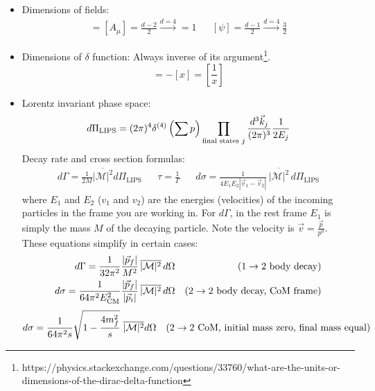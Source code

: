 \documentclass[11pt, oneside]{article}   	%
\theoremstyle{definition}
\numberwithin{equation}{subsection}		%
\begin{document}
\begin{itemize}
	\item Dimensions of fields:
	\begin{align}
		[\phi] = [A_\mu] = \frac{d - 2}{2}\xrightarrow{d = 4} = 1 && [\psi] = \frac{d - 1}{2} \xrightarrow{d = 4} \frac{3}{2}
	\end{align}
	
	\item Dimensions of $\delta$ function: Always inverse of its 
	argument\footnote{https://physics.stackexchange.com/questions/33760/what-are-the-units-or-dimensions-of-the-dirac-delta-function}.
	\begin{equation}
		[\delta(x)] = -[x] = \left[\frac{1}{x}\right]
	\end{equation}
	
	\item Lorentz invariant phase space:
	\begin{equation}
		d\Pi_\mathrm{LIPS} = (2\pi)^4 \delta^{(4)}\left(\sum p\right) \prod_{\textnormal{final states } j} \frac{d^3\vec k_j}{(2\pi)^3} \frac{1}{2 E_j}
	\end{equation}
	Decay rate and cross section formulas:
	\begin{align}
		d\Gamma = \frac{1}{2 M} \overline{|\mathcal M|^2} d\Pi_\mathrm{LIPS} && \tau = \frac{1}{\Gamma} && d\sigma = \frac{1}{4 E_1 E_2 |\vec v_1 - \vec v_2|}\,
		\overline{|\mathcal M|^2}\,d\Pi_\mathrm{LIPS}
	\end{align}
	where $E_1$ and $E_2$ ($v_1$ and $v_2$) are the energies (velocities) of the incoming particles in the frame you are working in. For $d\Gamma$, in the rest frame $E_1$ is simply 
	the mass $M$ of the decaying particle. Note the velocity is $\vec v = \frac{\vec p}{p^0}$. These equations simplify in certain cases:
	\begin{align}
		d\Gamma = \frac{1}{32\pi^2} \frac{|\vec p_f|}{M^2}\,\overline{|\mathcal M|^2}\,d\Omega && (1\rightarrow \textnormal{2 body decay}) \\
		d\sigma = \frac{1}{64\pi^2 E_\mathrm{CM}^2}\frac{|\vec p_f|}{|\vec p_i|}\,\overline{|\mathcal M|^2}\,d\Omega && (2\rightarrow \textnormal{2 body decay, CoM frame})
	\end{align}
	\begin{align}
	d\sigma = \frac{1}{64\pi^2 s}\sqrt{1 - \frac{4 m_f^2}{s}} \;\overline{|\mathcal M|^2} d\Omega && (2\rightarrow 2 \textnormal{ CoM, initial mass zero, final mass equal}) 
	\end{align}
	

\end{itemize}
\end{document}
